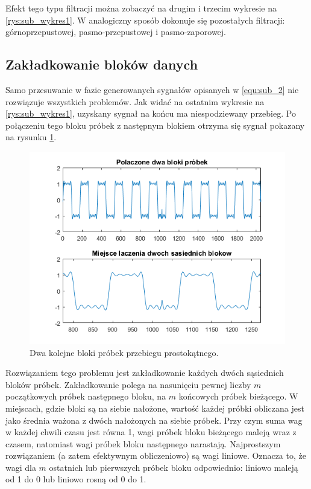 Efekt tego typu filtracji można zobaczyć na drugim i trzecim wykresie na \ref{rys:sub_wykres1}. W analogiczny sposób dokonuje się pozostałych filtracji: górnoprzepustowej, pasmo-przepustowej i pasmo-zaporowej.

\subsection{Zakładkowanie bloków danych}
Samo przesuwanie w fazie generowanych sygnałów opisanych w \ref{equ:sub_2} nie rozwiązuje wszystkich problemów. Jak widać na ostatnim wykresie na \ref{rys:sub_wykres1}, uzyskany sygnał na końcu ma niespodziewany przebieg. Po połączeniu tego bloku próbek z następnym blokiem otrzyma się sygnał pokazany na rysunku \ref{rys:sub_zakladkowania_brak}.
\begin{figure}[H]
	\centering
	\includegraphics[width=12cm]{grafiki/sub_zakladkowania_brak}
	\captionsetup{justification=centering}
	\caption{Dwa kolejne bloki próbek przebiegu prostokątnego.}
	\label{rys:sub_zakladkowania_brak}
\end{figure}
Rozwiązaniem tego problemu jest zakładkowanie każdych dwóch sąsiednich bloków próbek. Zakładkowanie polega na nasunięciu pewnej liczby $m$ początkowych próbek następnego bloku, na $m$ końcowych próbek bieżącego. W miejscach, gdzie bloki są na siebie nałożone, wartość każdej próbki obliczana jest jako średnia ważona z dwóch nałożonych na siebie próbek. Przy czym suma wag w każdej chwili czasu jest równa 1, wagi próbek bloku bieżącego maleją wraz z czasem, natomiast wagi próbek bloku następnego narastają. Najprostszym rozwiązaniem (a zatem efektywnym obliczeniowo) są wagi liniowe. Oznacza to, że wagi dla $m$ ostatnich lub pierwszych próbek bloku odpowiednio: liniowo maleją od 1 do 0 lub liniowo rosną od 0 do 1.
